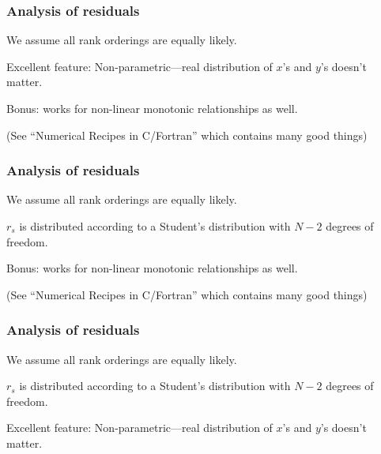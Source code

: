 \begin{frame}
  \frametitle{Analysis of residuals}

We assume all rank orderings are equally likely.


\inv

Excellent feature: Non-parametric---real distribution
of $x$'s and $y$'s doesn't matter.

Bonus: works for non-linear monotonic relationships as well.

{\tiny (See ``Numerical Recipes in C/Fortran'' which contains many good things)}

\vis

\end{frame}

\begin{frame}
  \frametitle{Analysis of residuals}

We assume all rank orderings are equally likely.

$r_s$ is distributed according to a Student's distribution
with $N-2$ degrees of freedom.


\inv

Bonus: works for non-linear monotonic relationships as well.

{\tiny (See ``Numerical Recipes in C/Fortran'' which contains many good things)}

\vis

\end{frame}

\begin{frame}
  \frametitle{Analysis of residuals}

We assume all rank orderings are equally likely.

$r_s$ is distributed according to a Student's distribution
with $N-2$ degrees of freedom.

Excellent feature: Non-parametric---real distribution
of $x$'s and $y$'s doesn't matter.


\inv

{\tiny {}}


\vis

\end{frame}

